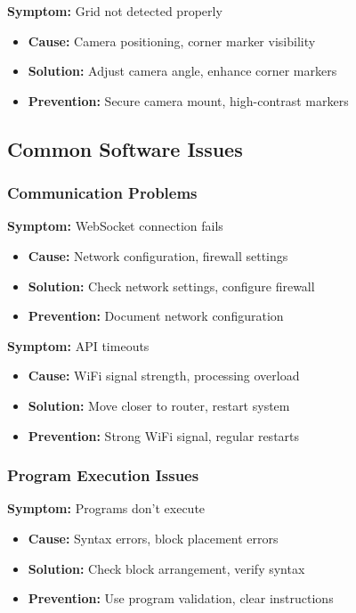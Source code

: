 \textbf{Symptom:} Grid not detected properly
\begin{itemize}
    \item \textbf{Cause:} Camera positioning, corner marker visibility
    \item \textbf{Solution:} Adjust camera angle, enhance corner markers
    \item \textbf{Prevention:} Secure camera mount, high-contrast markers
\end{itemize}

\subsection{Common Software Issues}

\subsubsection{Communication Problems}

\textbf{Symptom:} WebSocket connection fails
\begin{itemize}
    \item \textbf{Cause:} Network configuration, firewall settings
    \item \textbf{Solution:} Check network settings, configure firewall
    \item \textbf{Prevention:} Document network configuration
\end{itemize}

\textbf{Symptom:} API timeouts
\begin{itemize}
    \item \textbf{Cause:} WiFi signal strength, processing overload
    \item \textbf{Solution:} Move closer to router, restart system
    \item \textbf{Prevention:} Strong WiFi signal, regular restarts
\end{itemize}

\subsubsection{Program Execution Issues}

\textbf{Symptom:} Programs don't execute
\begin{itemize}
    \item \textbf{Cause:} Syntax errors, block placement errors
    \item \textbf{Solution:} Check block arrangement, verify syntax
    \item \textbf{Prevention:} Use program validation, clear instructions
\end{itemize}

